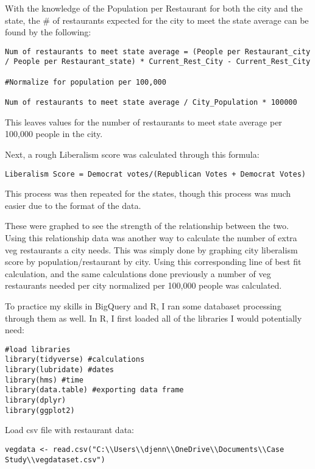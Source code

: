 \documentclass[
]{article}
\begin{document}
With the knowledge of the Population per Restaurant for both the city
and the state, the \# of restaurants expected for the city to meet the
state average can be found by the following:

\begin{verbatim}
Num of restaurants to meet state average = (People per Restaurant_city / People per Restaurant_state) * Current_Rest_City - Current_Rest_City

#Normalize for population per 100,000

Num of restaurants to meet state average / City_Population * 100000
\end{verbatim}

This leaves values for the number of restaurants to meet state average
per 100,000 people in the city.

Next, a rough Liberalism score was calculated through this formula:

\begin{verbatim}
Liberalism Score = Democrat votes/(Republican Votes + Democrat Votes)
\end{verbatim}

This process was then repeated for the states, though this process was
much easier due to the format of the data.

These were graphed to see the strength of the relationship between the
two. Using this relationship data was another way to calculate the
number of extra veg restaurants a city needs. This was simply done by
graphing city liberalism score by population/restaurant by city. Using
this corresponding line of best fit calculation, and the same
calculations done previously a number of veg restaurants needed per city
normalized per 100,000 people was calculated.

To practice my skills in BigQuery and R, I ran some databaset processing
through them as well. In R, I first loaded all of the libraries I would
potentially need:

\begin{verbatim}
#load libraries 
library(tidyverse) #calculations
library(lubridate) #dates 
library(hms) #time
library(data.table) #exporting data frame
library(dplyr)
library(ggplot2)
\end{verbatim}

Load csv file with restaurant data:

\begin{verbatim}
vegdata <- read.csv("C:\\Users\\djenn\\OneDrive\\Documents\\Case Study\\vegdataset.csv")
\end{verbatim}
\end{document}
